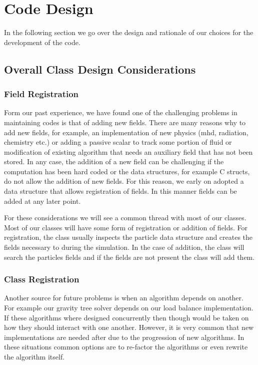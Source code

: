 \section{Code Design}
In the following section we go over the design and rationale of our choices
for the development of the code.

\subsection{Overall Class Design Considerations}
\subsubsection{Field Registration}
Form our past experience, we have found one of the challenging problems in maintaining codes
is that of adding new fields. There are many reasons why to add new fields, for example,
an implementation of new physics (mhd, radiation, chemistry etc.) or adding a passive scalar
to track some portion of fluid or modification of existing algorithm that needs an auxiliary
field that has not been stored. In any case, the addition of a new field can be challenging
if the computation has been hard coded or the data structures, for example C structs, do not
allow the addition of new fields. For this reason, we early on adopted a data structure
that allows registration of fields. In this manner fields can be added at any later point.

For these considerations we will see a common thread with most of our classes. Most of our
classes will have some form of registration or addition of fields. For registration, the
class usually inspects the particle data structure and creates the fields necessary to
during the simulation. In the case of addition, the class will search the particles fields
and if the fields are not present the class will add them.

\subsubsection{Class Registration}
Another source for future problems is when an algorithm depends on another. For example
our gravity tree solver depends on our load balance implementation. If these algorithms
where designed concurrently then though would be taken on how they should interact
with one another. However, it is very common that new implementations are needed after 
due to the progression of new algorithms. In these situations common options are to re-factor
the algorithms or even rewrite the algorithm itself.

